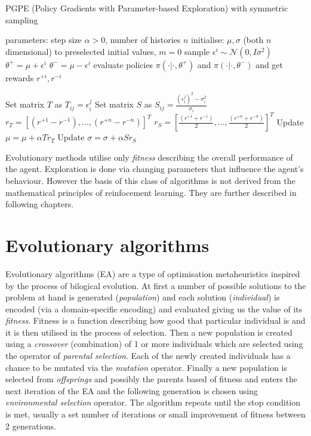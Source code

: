 \begin{algorithm}[h]
    \begin{algorithmic}[1]
    \caption{PGPE (Policy Gradients with Parameter-based Exploration) with symmetric sampling}
    \label{alg:pgpe}
        \State parameters: step size $\alpha>0$, number of histories $n$ 
        \State initialise: $\mu, \sigma$ (both $n$ dimensional) to preselected initial values, $m=0$
        \Repeat
                \State sample $\epsilon^i \sim \mathcal{N}(0,I\sigma^2)$
                \State $\theta^+ = \mu+\epsilon^i$
                \State $\theta^- = \mu-\epsilon^i$
                \State evaluate policies $\pi(\cdot|\cdot,\theta^+)$ and $\pi(\cdot|\cdot, \theta^-)$ and get rewards $r^{+i}, r^{-i}$
                
            \EndFor
            \State Set matrix $T$ as $T_{ij} = \epsilon_i^j$
            \State Set matrix $S$ as $S_{ij} = \frac{(\epsilon^j_i)^2-\sigma_i^2}{\sigma_i}$
            \State $r_T = [(r^{+1}-r^{-1}),\dots,(r^{+n}-r^{-n})]^T$
            \State $r_S = [\frac{(r^{+1}+r^{-1})}{2},\dots,\frac{(r^{+n}+r^{-n})}{2}]^T$
            \State Update $\mu = \mu + \alpha T r_T$
            \State Update $\sigma = \sigma + \alpha S r_S$
    \end{algorithmic}
\end{algorithm}


Evolutionary methods utilise only \emph{fitness} describing the overall performance of the agent. Exploration is done via changing parameters that influence the agent's behaviour. However the basis of this class of algorithms is not derived from the mathematical principles of reinfocement learning. They are further described in following chapters.

\section{Evolutionary algorithms}
\label{sec:ea}
Evolutionary algorithms (EA) are a type of optimisation metaheuristics inspired by the process of bilogical evolution. \cite{Vikhar2016} At first a number of possible solutions to the problem at hand is generated (\emph{population}) and each solution (\emph{individual}) is encoded (via a domain-specific encoding) and evaluated giving us the value of its \emph{fitness}. Fitness is a function describing how good that particular individual is and it is then utilised in the process of selection. Then a new population is created using a \emph{crossover} (combination) of 1 or more individuals which are selected using the operator of \emph{parental selection}. Each of the newly created individuals has a chance to be mutated via the \emph{mutation} operator. Finally a new population is selected from \emph{offsprings} and possibly the parents based of fitness and enters the next iteration of the EA and the following generation is chosen using \emph{environmental selection} operator. The algorithm repeats until the stop condition is met, usually a set number of iterations or small improvement of fitness between 2 generations. 

